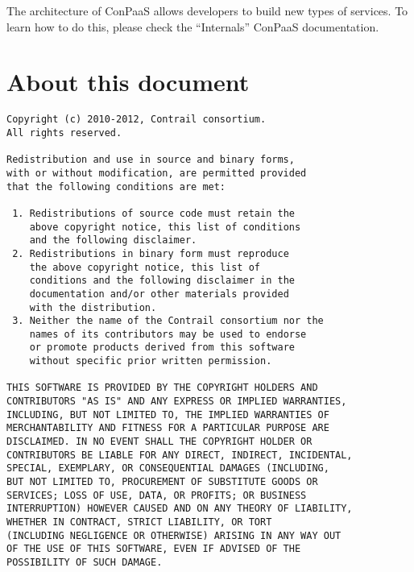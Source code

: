 \documentclass[10pt]{article}
\begin{document}
The architecture of ConPaaS allows developers to build new types of
services. To learn how to do this, please check the ``Internals''
ConPaaS documentation.

\section{About this document}

\begin{verbatim}
Copyright (c) 2010-2012, Contrail consortium.
All rights reserved.

Redistribution and use in source and binary forms, 
with or without modification, are permitted provided
that the following conditions are met:

 1. Redistributions of source code must retain the
    above copyright notice, this list of conditions
    and the following disclaimer.
 2. Redistributions in binary form must reproduce
    the above copyright notice, this list of 
    conditions and the following disclaimer in the
    documentation and/or other materials provided
    with the distribution.
 3. Neither the name of the Contrail consortium nor the
    names of its contributors may be used to endorse
    or promote products derived from this software 
    without specific prior written permission.

THIS SOFTWARE IS PROVIDED BY THE COPYRIGHT HOLDERS AND
CONTRIBUTORS "AS IS" AND ANY EXPRESS OR IMPLIED WARRANTIES,
INCLUDING, BUT NOT LIMITED TO, THE IMPLIED WARRANTIES OF
MERCHANTABILITY AND FITNESS FOR A PARTICULAR PURPOSE ARE
DISCLAIMED. IN NO EVENT SHALL THE COPYRIGHT HOLDER OR
CONTRIBUTORS BE LIABLE FOR ANY DIRECT, INDIRECT, INCIDENTAL,
SPECIAL, EXEMPLARY, OR CONSEQUENTIAL DAMAGES (INCLUDING, 
BUT NOT LIMITED TO, PROCUREMENT OF SUBSTITUTE GOODS OR 
SERVICES; LOSS OF USE, DATA, OR PROFITS; OR BUSINESS 
INTERRUPTION) HOWEVER CAUSED AND ON ANY THEORY OF LIABILITY,
WHETHER IN CONTRACT, STRICT LIABILITY, OR TORT
(INCLUDING NEGLIGENCE OR OTHERWISE) ARISING IN ANY WAY OUT
OF THE USE OF THIS SOFTWARE, EVEN IF ADVISED OF THE
POSSIBILITY OF SUCH DAMAGE.
\end{verbatim}
\end{document}

